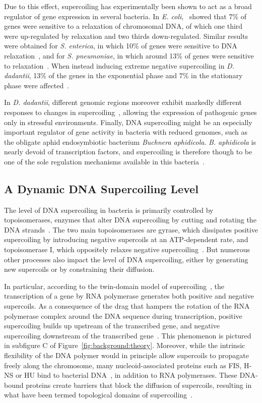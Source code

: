 Due to this effect, supercoiling has experimentally been shown to act as a broad regulator of gene expression in several bacteria.
In \emph{E. coli},~\cite{peter2004} showed that 7\% of genes were sensitive to a relaxation of chromosomal DNA, of which one third were up-regulated by relaxation and two thirds down-regulated.
Similar results were obtained for \emph{S. enterica}, in which 10\% of genes were sensitive to DNA relaxation~\citep{webber2013}, and for \emph{S. pneumoniae}, in which around 13\% of genes were sensitive to relaxation~\citep{ferrandiz2010}.
When instead inducing extreme negative supercoiling in \emph{D. dadantii}, 13\% of the genes in the exponential phase and 7\% in the stationary phase were affected~\citep{pineau2022a}.

In \emph{D. dadantii}, different genomic regions moreover exhibit markedly different responses to changes in supercoiling~\citep{muskhelishvili2019}, allowing the expression of pathogenic genes only in stressful environments.
Finally, DNA supercoiling might be an especially important regulator of gene activity in bacteria with reduced genomes, such as the obligate aphid endosymbiotic bacterium \emph{Buchnera aphidicola}.
\emph{B. aphidicola} is nearly devoid of transcription factors, and supercoiling is therefore though to be one of the sole regulation mechanisms available in this bacteria~\citep{brinza2013}.

\subsection{A Dynamic DNA Supercoiling Level}

The level of DNA supercoiling in bacteria is primarily controlled by topoisomerases, enzymes that alter DNA supercoiling by cutting and rotating the DNA strands~\citep{duprey2021}.
The two main topoisomerases are gyrase, which dissipates positive supercoiling by introducing negative supercoils at an ATP-dependent rate, and topoisomerase I, which oppositely relaxes negative supercoiling~\citep{martisb.2019}.
But numerous other processes also impact the level of DNA supercoiling, either by generating new supercoils or by constraining their diffusion.

In particular, according to the twin-domain model of supercoiling~\citep{liu1987}, the transcription of a gene by RNA polymerase generates both positive and negative supercoils.
As a consequence of the drag that hampers the rotation of the RNA polymerase complex around the DNA sequence during transcription, positive supercoiling builds up upstream of the transcribed gene, and negative supercoiling downstream of the transcribed gene~\citep{visser2022}.
This phenomenon is pictured in subfigure C of Figure~\ref{fig:background:theory}.
Moreover, while the intrinsic flexibility of the DNA polymer would in principle allow supercoils to propagate freely along the chromosome, many nucleoid-associated proteins such as FIS, H-NS or HU bind to bacterial DNA~\citep{krogh2018}, in addition to RNA polymerases.
These DNA-bound proteins create barriers that block the diffusion of supercoils, resulting in what have been termed topological domains of supercoiling~\citep{postow2004}.

